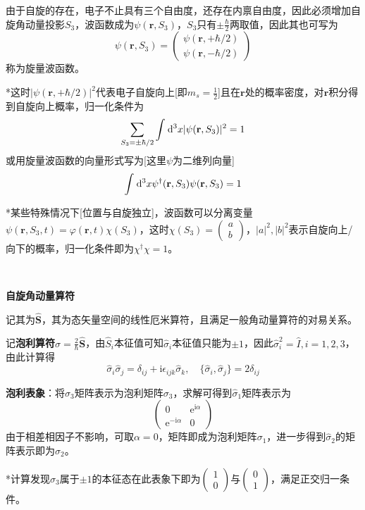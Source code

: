 \documentclass[a4paper,UTF8,fontset=windows]{ctexart}
\newcommand*{\dr}{\hspace{0.07em}\mathrm{d}}
\newcommand*{\ir}{\mathrm{i}}
\newcommand*{\er}{\mathrm{e}}
\newcommand*{\br}{\mathbf{r}}
\begin{document}
由于自旋的存在，电子不止具有三个自由度，还存在内禀自由度，因此必须增加自旋角动量投影$S_3$，波函数成为$\psi(\br,S_3)$，$S_3$只有$\pm\frac{\hbar}{2}$两取值，因此其也可写为
$$\psi(\br,S_3)=\begin{pmatrix}\psi(\br,+\hbar/2)\\\psi(\br,-\hbar/2)\end{pmatrix}$$
称为旋量波函数。

*这时$|\psi(\br,+\hbar/2)|^2$代表电子自旋向上[即$m_s=\frac{1}{2}$]且在$\br$处的概率密度，对$\br$积分得到自旋向上概率，归一化条件为
$$\sum_{S_3=\pm\hbar/2}\int\dr^3x|\psi(\br,S_3)|^2=1$$
或用旋量波函数的向量形式写为[这里$\psi$为二维列向量]
$$\int\dr^3x\psi^\dagger(\br,S_3)\psi(\br,S_3)=1$$

*某些特殊情况下[位置与自旋独立]，波函数可以分离变量$\psi(\br,S_3,t)=\varphi(\br,t)\chi(S_3)$，这时$\chi(S_3)=\begin{pmatrix}a\\b\end{pmatrix}$，$|a|^2,|b|^2$表示自旋向上/向下的概率，归一化条件即为$\chi^\dagger\chi=1$。

\

\textbf{自旋角动量算符}

记其为$\hat{\mathbf{S}}$，其为态矢量空间的线性厄米算符，且满足一般角动量算符的对易关系。

记\textbf{泡利算符}$\hat{\sigma}=\frac{2}{\hbar}\hat{\mathbf{S}}$，由$\hat{S}_i$本征值可知$\hat{\sigma}_i$本征值只能为$\pm1$，因此$\hat{\sigma}_i^2=\hat{I},i=1,2,3$，由此计算得
$$\hat{\sigma}_i\hat{\sigma}_j=\delta_{ij}+\ir\epsilon_{ijk}\hat{\sigma}_k,\quad\{\hat{\sigma}_i,\hat{\sigma}_j\}=2\delta_{ij}$$

\textbf{泡利表象}：将$\hat{\sigma}_3$矩阵表示为泡利矩阵$\sigma_3$，求解可得到$\hat{\sigma}_1$矩阵表示为
$$\begin{pmatrix}0&\er^{\ir\alpha}\\\er^{-\ir\alpha}&0\end{pmatrix}$$
由于相差相因子不影响，可取$\alpha=0$，矩阵即成为泡利矩阵$\sigma_1$，进一步得到$\hat{\sigma}_2$的矩阵表示即为$\sigma_2$。

*计算发现$\sigma_3$属于$\pm1$的本征态在此表象下即为$\begin{pmatrix}1\\0\end{pmatrix}$与$\begin{pmatrix}0\\1\end{pmatrix}$，满足正交归一条件。
\end{document}

